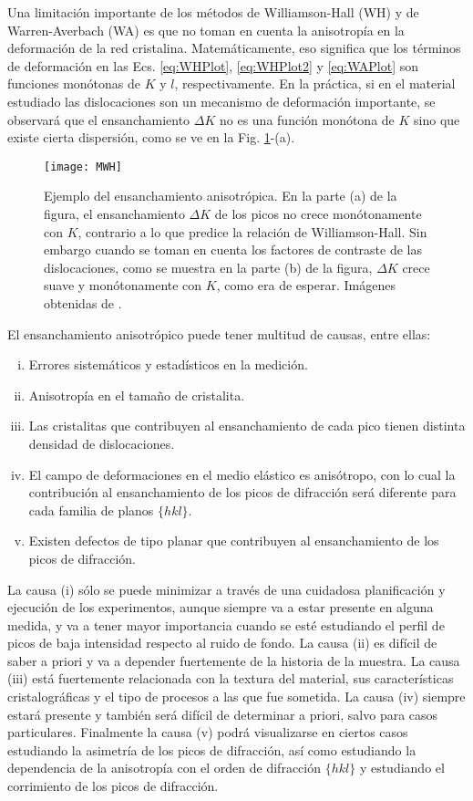 Una limitación importante de los métodos de Williamson-Hall (WH) y de Warren-Averbach (WA) es que no toman en cuenta la anisotropía en la deformación de la red cristalina. 
Matemáticamente, eso significa que los términos de deformación en las Ecs. \ref{eq:WHPlot}, \ref{eq:WHPlot2} y \ref{eq:WAPlot} son funciones monótonas de $K$ y $l$, respectivamente.
En la práctica, si en el material estudiado las dislocaciones son un mecanismo de deformación importante, se observará que el ensanchamiento $\Delta K$ no es una función monótona de $K$ sino que existe cierta dispersión, como se ve en la Fig. \ref{fig:MWH}-(a). 

\begin{figure}[!htb]
  \centering
  \texttt{[image: MWH]}
  \caption{Ejemplo del ensanchamiento anisotrópica. En la parte (a) de la figura, el ensanchamiento $\Delta K$ de los picos no crece monótonamente con $K$, contrario a lo que predice la relación de Williamson-Hall. Sin embargo cuando se toman en cuenta los factores de contraste de las dislocaciones, como se muestra en la parte (b) de la figura, $\Delta K$ crece suave y monótonamente con $K$, como era de esperar. Imágenes obtenidas de \cite{Ungar1999}.}
  \label{fig:MWH}
\end{figure}

El ensanchamiento anisotrópico puede tener multitud de causas, entre ellas:
\begin{enumerate}[(i)]
  \item Errores sistemáticos y estadísticos en la medición. 
  \item Anisotropía en el tamaño de cristalita.
  \item Las cristalitas que contribuyen al ensanchamiento de cada pico tienen distinta densidad de dislocaciones.
  \item El campo de deformaciones en el medio elástico es anisótropo, con lo cual la contribución al ensanchamiento de los picos de difracción será diferente para cada familia de planos $\{hkl\}$.
  \item Existen defectos de tipo planar que contribuyen al ensanchamiento de los picos de difracción.
\end{enumerate}

La causa (i) sólo se puede minimizar a través de una cuidadosa planificación y ejecución de los experimentos, aunque siempre va a estar presente en alguna medida, y va a tener mayor importancia cuando se esté estudiando el perfil de picos de baja intensidad respecto al ruido de fondo. 
La causa (ii) es difícil de saber a priori y va a depender fuertemente de la historia de la muestra. 
La causa (iii) está fuertemente relacionada con la textura del material, sus características cristalográficas y el tipo de procesos a las que fue sometida. 
La causa (iv) siempre estará presente y también será difícil de determinar a priori, salvo para casos particulares.
Finalmente la causa (v) podrá visualizarse en ciertos casos estudiando la asimetría de los picos de difracción, así como estudiando la dependencia de la anisotropía con el orden de difracción $\{hkl\}$ y estudiando el corrimiento de los picos de difracción.

